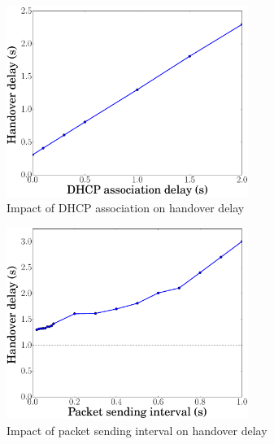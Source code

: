 \begin{figure}[!th]
	\centering
	\includegraphics[width=0.7\textwidth]{Pics/LISP_mobility_double_encap_DHCP}
	\caption{Impact of DHCP association on handover delay}
	\label{LISP_mobility_double_encap_DHCP}
\end{figure}


\begin{figure}[!th]
	\centering
	\includegraphics[width=0.7\textwidth]{Pics/LISP_mobility_double_encap_PacketInterval}
	\caption{Impact of packet sending interval on handover delay}
	\label{LISP_mobility_double_encap_PacketInterval}
\end{figure}


